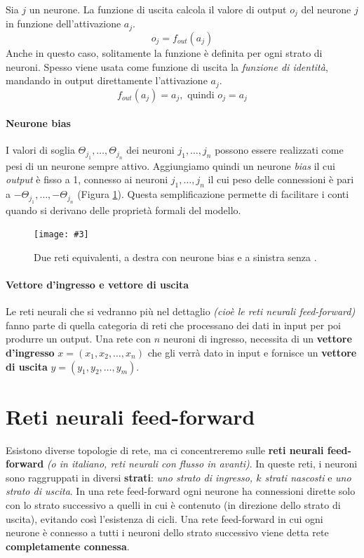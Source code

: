 \documentclass[12pt, twoside, letterpaper]{report}
\newcommand{\img}[4] {
	\begin{figure}
		\centering
		\texttt{[image: \#3]}\\
		\caption{#1}
		\label{fig:#4}
	\end{figure}
}
\begin{document}
			 	Sia $j$ un neurone. La funzione di uscita calcola il valore di output $o_j$ del neurone $j$ in funzione dell'attivazione $a_j$. $$o_j = f_{out}(a_j)$$  
			 	Anche in questo caso, solitamente la funzione è definita per ogni strato di neuroni. Spesso viene usata come funzione di uscita la \textit{funzione di identità}, mandando in output direttamente l'attivazione $a_j$. $$f_{out}(a_j) = a_j, \text{ quindi } o_j = a_j$$
			 	
			 \paragraph{Neurone bias} I valori di soglia $\Theta_{j_1}, \dots, \Theta_{j_n}$ dei neuroni $j_1, \dots, j_n$ possono essere realizzati come pesi di un neurone sempre attivo. Aggiungiamo quindi un neurone \textit{bias} il cui \textit{output} è fisso a 1, connesso ai neuroni $j_1, \dots, j_n$ il cui peso delle connessioni è pari a $-\Theta_{j_1}, \dots, -\Theta_{j_n}$ (Figura \ref{fig:bias}). Questa semplificazione permette di facilitare i conti quando si derivano delle proprietà formali del modello.
			 
			 	\img{Due reti equivalenti, a destra con neurone bias e a sinistra senza \cite{kriesel}.}{0.5}{bias-neuron.png}{bias}
			 	
			 \paragraph{Vettore d'ingresso e vettore di uscita} Le reti neurali che si vedranno più nel dettaglio \textit{(cioè le reti neurali feed-forward)} fanno parte di quella categoria di reti che processano dei dati in input per poi produrre un output. Una rete con $n$ neuroni di ingresso, necessita di un \textbf{vettore d'ingresso} $x = (x_1, x_2, \dots, x_n)$ che gli verrà dato in input e fornisce un \textbf{vettore di uscita} $y = (y_1, y_2, \dots, y_m)$.  
			 	 			 
		\section{Reti neurali feed-forward}
			Esistono diverse topologie di rete, ma ci concentreremo sulle \textbf{reti neurali feed-forward} \textit{(o in italiano, reti neurali con flusso in avanti)}. In queste reti, i neuroni sono raggruppati in diversi \textbf{strati}: \textit{uno strato di ingresso, $k$ strati nascosti} e \textit{uno strato di uscita}. In una rete feed-forward ogni neurone ha connessioni dirette solo con lo strato successivo a quelli in cui è contenuto (in direzione dello strato di uscita), evitando così l'esistenza di cicli. Una rete feed-forward in cui ogni neurone è connesso a tutti i neuroni dello strato successivo viene detta rete \textbf{completamente connessa}.
\end{document}
